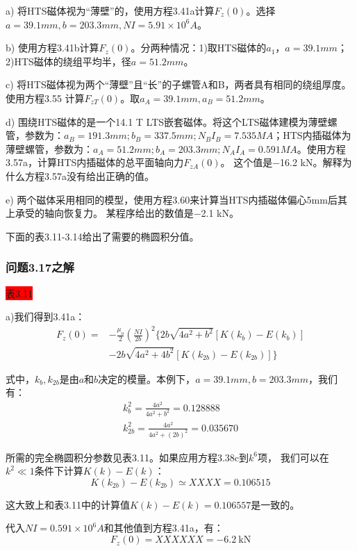 a) 将HTS磁体视为“薄壁”的，使用方程3.41a计算$F_z(0)$。选择$a=39.1 mm, b=203.3 mm, NI =5.91\times 10^6 A$。

b) 使用方程3.41b计算$F_z(0)$。分两种情况：1)取HTS磁体的$a_1$，$a=39.1 mm$；2)HTS磁体的绕组平均半，径$a=51.2 mm$。

c) 将HTS磁体视为两个“薄壁”且“长”的子螺管A和B，两者具有相同的绕组厚度。使用方程3.55
计算$F_{zT}(0)$。取$a_A=39.1 mm , a_B=51.2 mm$。

d) 围绕HTS磁体的是一个14.1 T LTS嵌套磁体。将这个LTS磁体建模为薄壁螺管，参数为：$a_B = 191.3 mm;
b_B= 337.5 mm; N_BI_B = 7.535 MA$；HTS内插磁体为薄壁螺管，参数为：$a_A = 51.2 mm; b_A = 203.3 mm;
 N_A I_A = 0.591 MA$。使用方程3.57a，计算HTS内插磁体的总平面轴向力$F_{zA}(0)$。
 这个值是−16.2 kN。解释为什么方程3.57a没有给出正确的值。

e) 两个磁体采用相同的模型，使用方程3.60来计算当HTS内插磁体偏心5mm后其上承受的轴向恢复力。
某程序给出的数值是−2.1 kN。

下面的表3.11-3.14给出了需要的椭圆积分值。

\subsubsection{问题3.17之解}
\colorbox{red}{表3.11}

a)我们得到3.41a：
\begin{equation}
\begin{split}
F_{z}(0)=&-\frac{\mu_{o}}{2}(\frac{NI}{2b})^{2}\{2b\sqrt{4a^{2}+b^{2}}[K(k_{b})-E(k_{b})]\\
&-2b\sqrt{4a^{2}+4b^{2}}[K(k_{2b})-E(k_{2b})]\}%
\end{split}
\end{equation}

式中，$k_b,k_{2b}$是由$a$和$b$决定的模量。本例下，$a=39.1 mm,b=203.3 mm$，我们有：
\begin{eqnarray}
k_b^2=\frac{4a^2}{4a^2+b^2}=0.128888\\
k_{2b}^2=\frac{4a^2}{4a^2+(2b)^2}=0.035670
\end{eqnarray}

所需的完全椭圆积分参数见表3.11。如果应用方程3.38c到$k^6$项，
我们可以在$k^2\ll 1$条件下计算$ K(k)−E(k)$：
\begin{equation}
K(k_{2b})-E(k_{2b})\simeq XXXX=0.106515
\end{equation}

这大致上和表3.11中的计算值$K(k)−E(k)=0.106557$是一致的。

代入$NI =0.591\times 10^6 A$和其他值到方程3.41a，有：
\begin{equation*}
F_z(0)=XXXXXX=-6.2\ \mathrm{kN}
\end{equation*}

